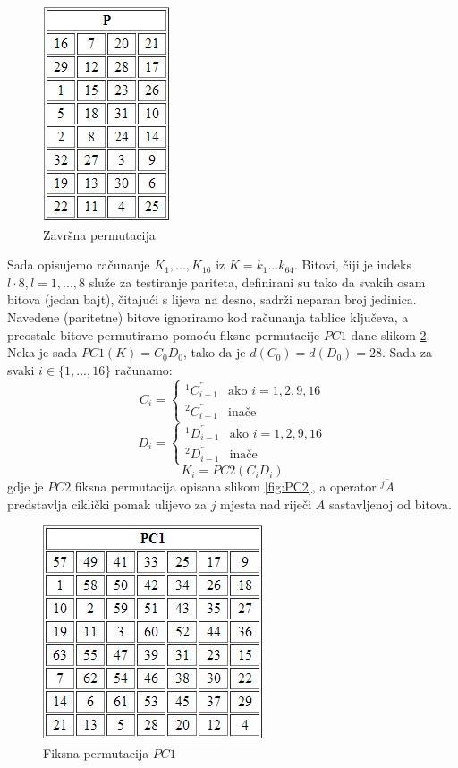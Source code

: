 \documentclass[a4paper,oneside,12pt]{memoir} %
\begin{document}
\begin{spacing}{1.5}
\begin{figure}[h]
\centering \includegraphics[scale=1]{P.jpg}
\caption{Završna permutacija}
\label{fig:permP}
\end{figure}

Sada opisujemo računanje $K_1,...,K_{16}$ iz $K=k_1...k_{64}$. Bitovi, čiji je indeks $l\cdot 8, l=1,...,8$ služe za testiranje pariteta, definirani su tako da svakih osam bitova (jedan bajt), čitajući s lijeva na desno, sadrži neparan broj jedinica. Navedene (paritetne) bitove ignoriramo kod računanja tablice ključeva, a preostale bitove permutiramo  pomoću fiksne permutacije $PC1$ dane slikom \ref{fig:PC1}. Neka je sada $PC1(K)=C_0D_0$, tako da je $d(C_0)=d(D_0)=28$. Sada za svaki $i \in \{1,...,16\}$ računamo:
\[C_i=\begin{cases}^1\overleftarrow{C_{i-1}} &\mbox{ako } i=1,2,9,16 \\  ^2\overleftarrow{C_{i-1}} &\mbox{inače } \end{cases}\]
\[D_i=\begin{cases}^1\overleftarrow{D_{i-1}} &\mbox{ako } i=1,2,9,16 \\  ^2\overleftarrow{D_{i-1}} &\mbox{inače } \end{cases}\]
\[K_i=PC2(C_iD_i)\]
gdje je $PC2$ fiksna permutacija opisana slikom \ref{fig:PC2}, a operator $^j\overleftarrow{A}$ predstavlja ciklički pomak ulijevo za  $j$ mjesta nad riječi $A$ sastavljenoj od bitova.
\begin{figure}[h]
\centering \includegraphics[scale=0.8]{PC1.jpg}
\caption{Fiksna permutacija $PC1$}
\label{fig:PC1}
\end{figure}


\end{spacing}
\end{document}
